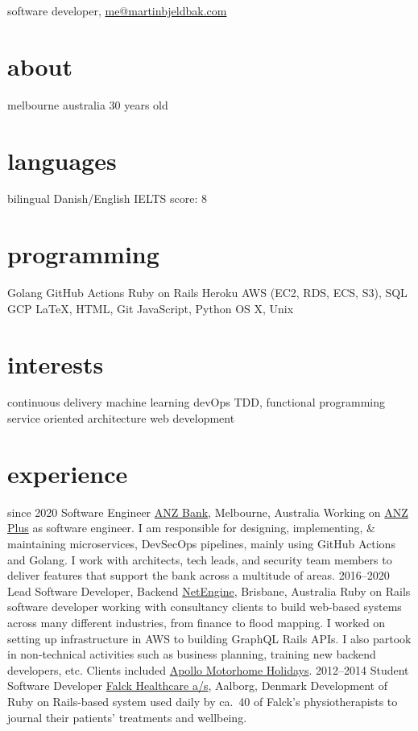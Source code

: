\documentclass{afriggeri-cv/friggeri-cv}
\begin{document}
{software developer, \href{mailto:me@martinbjeldbak.com}{me@martinbjeldbak.com}}

\begin{aside}
  \section{about}
    melbourne
    australia
    \hfill
    30 years old
  \section{languages}
    bilingual Danish/English
    IELTS score: 8
  \section{programming}
    Golang
    GitHub Actions
    Ruby on Rails
    Heroku
    AWS (EC2, RDS, ECS, S3), SQL
    GCP
    \LaTeX, HTML, Git
    JavaScript, Python
    OS X, Unix
  \section{interests}
    continuous delivery
    machine learning
    devOps
    TDD, functional programming
    service oriented architecture
    web development
\end{aside}

\section{experience}

\begin{entrylist}
  \entry%
    {since 2020}
    {Software Engineer}
    {\href{https://www.anz.com.au}{ANZ Bank}, Melbourne, Australia}
    {Working on \href{https://www.anz.com.au/plus}{ANZ Plus} as software engineer.
    I am responsible for designing, implementing, \& maintaining microservices, DevSecOps pipelines, mainly using GitHub Actions and Golang. I work with architects, tech leads, and security team members to deliver features that support the bank across a multitude of areas.}
  \entry%
    {2016--2020}
    {Lead Software Developer, Backend}
    {\href{https://netengine.com.au/}{NetEngine}, Brisbane, Australia}
    {Ruby on Rails software developer working with consultancy clients to build web-based systems across
      many different industries, from finance to flood mapping. I worked on setting up infrastructure
      in AWS to building GraphQL Rails APIs.
      I also partook in non-technical activities such as business planning, training new backend developers,
      etc. Clients included \href{https://www.apollocamper.com}{Apollo Motorhome Holidays}.}
  \entry%
    {2012--2014}
    {Student Software Developer}
    {\href{https://www.falck.com/services/healthcare}{Falck Healthcare a/s}, Aalborg, Denmark}
    {Development of Ruby on Rails-based system used daily by ca.\ 40 of Falck's physiotherapists to journal their patients' treatments and wellbeing.}
\end{entrylist}
\end{document}
